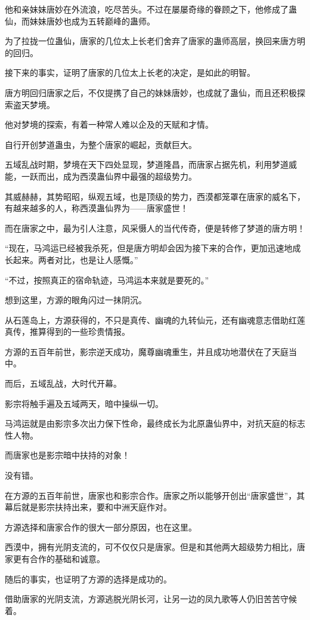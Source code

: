 \begin{this_body}
他和亲妹妹唐妙在外流浪，吃尽苦头。不过在屡屡奇缘的眷顾之下，他修成了蛊仙，而妹妹唐妙也成为五转巅峰的蛊师。

为了拉拢一位蛊仙，唐家的几位太上长老们舍弃了唐家的蛊师高层，换回来唐方明的回归。

接下来的事实，证明了唐家的几位太上长老的决定，是如此的明智。

唐方明回归唐家之后，不仅提携了自己的妹妹唐妙，也成就了蛊仙，而且还积极探索盗天梦境。

他对梦境的探索，有着一种常人难以企及的天赋和才情。

自行开创梦道蛊虫，为整个唐家的崛起，贡献巨大。

五域乱战时期，梦境在天下四处显现，梦道隆昌，而唐家占据先机，利用梦道威能，一跃而出，成为西漠蛊仙界中最强的超级势力。

其威赫赫，其势昭昭，纵观五域，也是顶级的势力，西漠都笼罩在唐家的威名下，有越来越多的人，称西漠蛊仙界为——唐家盛世！

而在唐家之中，最为引人注意，风采慑人的当代传奇，便是转修了梦道的唐方明！

“现在，马鸿运已经被我杀死，但是唐方明却会因为接下来的合作，更加迅速地成长起来。两者对比，也是让人感慨。”

“不过，按照真正的宿命轨迹，马鸿运本来就是要死的。”

想到这里，方源的眼角闪过一抹阴沉。

从石莲岛上，方源获得的，不只是真传、幽魂的九转仙元，还有幽魂意志借助红莲真传，推算得到的一些珍贵情报。

方源的五百年前世，影宗逆天成功，魔尊幽魂重生，并且成功地潜伏在了天庭当中。

而后，五域乱战，大时代开幕。

影宗将触手遍及五域两天，暗中操纵一切。

马鸿运就是由影宗多次出力保下性命，最终成长为北原蛊仙界中，对抗天庭的标志性人物。

而唐家也是影宗暗中扶持的对象！

没有错。

在方源的五百年前世，唐家也和影宗合作。唐家之所以能够开创出“唐家盛世”，其幕后就是影宗扶持出来，要和中洲天庭作对。

方源选择和唐家合作的很大一部分原因，也在这里。

西漠中，拥有光阴支流的，可不仅仅只是唐家。但是和其他两大超级势力相比，唐家更有合作的基础和诚意。

随后的事实，也证明了方源的选择是成功的。

借助唐家的光阴支流，方源逃脱光阴长河，让另一边的凤九歌等人仍旧苦苦守候着。


\end{this_body}
